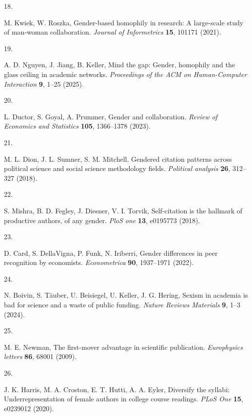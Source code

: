 \documentclass[
  11pt, %
]{article}
\newlength{\cslhangindent}
\newlength{\csllabelwidth}
\newenvironment{CSLReferences}[2] %
 {\begin{list}{}{%
  \setlength{\itemindent}{0pt}
  \setlength{\leftmargin}{0pt}
  \setlength{\parsep}{0pt}
  \ifodd #1
   \setlength{\leftmargin}{\cslhangindent}
   \setlength{\itemindent}{-1\cslhangindent}
  \fi
  \setlength{\itemsep}{#2\baselineskip}}}
 {\end{list}}
\newcommand{\CSLLeftMargin}[1]{\parbox[t]{\csllabelwidth}{\strut#1\strut}}
\newcommand{\CSLRightInline}[1]{\parbox[t]{\linewidth - \csllabelwidth}{\strut#1\strut}}
\begin{document}
\begin{CSLReferences}{0}{1}
\CSLLeftMargin{18. }%
\CSLRightInline{M. Kwiek, W. Roszka, Gender-based homophily in research: A large-scale study of man-woman collaboration. \emph{Journal of Informetrics} \textbf{15}, 101171 (2021).}

\CSLLeftMargin{19. }%
\CSLRightInline{A. D. Nguyen, J. Jiang, B. Keller, Mind the gap: Gender, homophily and the glass ceiling in academic networks. \emph{Proceedings of the ACM on Human-Computer Interaction} \textbf{9}, 1--25 (2025).}

\CSLLeftMargin{20. }%
\CSLRightInline{L. Ductor, S. Goyal, A. Prummer, Gender and collaboration. \emph{Review of Economics and Statistics} \textbf{105}, 1366--1378 (2023).}

\CSLLeftMargin{21. }%
\CSLRightInline{M. L. Dion, J. L. Sumner, S. M. Mitchell, Gendered citation patterns across political science and social science methodology fields. \emph{Political analysis} \textbf{26}, 312--327 (2018).}

\CSLLeftMargin{22. }%
\CSLRightInline{S. Mishra, B. D. Fegley, J. Diesner, V. I. Torvik, Self-citation is the hallmark of productive authors, of any gender. \emph{PloS one} \textbf{13}, e0195773 (2018).}

\CSLLeftMargin{23. }%
\CSLRightInline{D. Card, S. DellaVigna, P. Funk, N. Iriberri, Gender differences in peer recognition by economists. \emph{Econometrica} \textbf{90}, 1937--1971 (2022).}

\CSLLeftMargin{24. }%
\CSLRightInline{N. Boivin, S. Täuber, U. Beisiegel, U. Keller, J. G. Hering, Sexism in academia is bad for science and a waste of public funding. \emph{Nature Reviews Materials} \textbf{9}, 1--3 (2024).}

\CSLLeftMargin{25. }%
\CSLRightInline{M. E. Newman, The first-mover advantage in scientific publication. \emph{Europhysics letters} \textbf{86}, 68001 (2009).}

\CSLLeftMargin{26. }%
\CSLRightInline{J. K. Harris, M. A. Croston, E. T. Hutti, A. A. Eyler, Diversify the syllabi: Underrepresentation of female authors in college course readings. \emph{PLoS One} \textbf{15}, e0239012 (2020).}


\end{CSLReferences}
\end{document}
